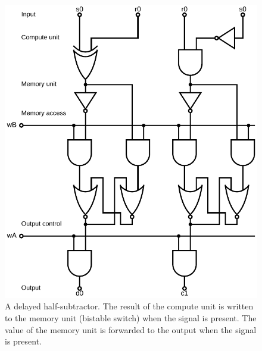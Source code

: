 \documentclass[12pt,notitlepage]{article}
\begin{document}
\begin{figure}[phbt]
\centering
\includegraphics[width=0.5\linewidth]{circuits/Logical-HalfSubtractor0.svg.pdf}
\caption{%
A delayed half-subtractor.
%
The result of the compute unit is written to the memory unit
(bistable switch)
when the signal  is present.
%
The value of the memory unit is
forwarded to the output
when the signal  is present.
}
\label{f:logical-halfsubtractor0}
\end{figure}




\clearpage

\SHOWTODOS




\leavevmode\vfill{\tiny\color{lightgray}\hfill{\DTMnow}}
\end{document}
